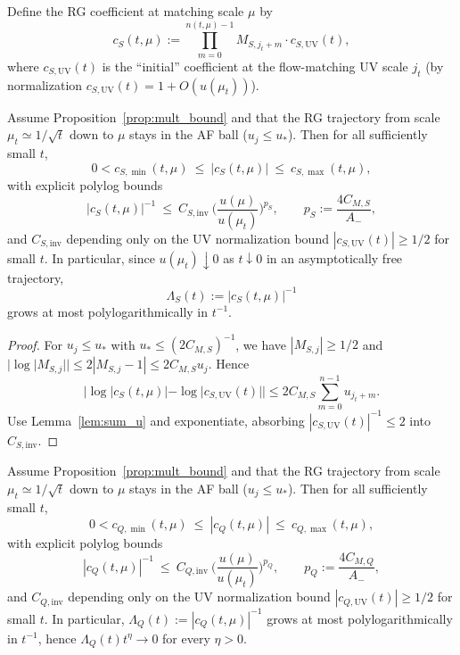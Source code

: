 Define the RG coefficient at matching scale $\mu$ by
\[
c_S(t,\mu):=\prod_{m=0}^{n(t,\mu)-1} M_{S,j_t+m}\cdot c_{S,\mathrm{UV}}(t),
\]
where $c_{S,\mathrm{UV}}(t)$ is the ``initial'' coefficient at the flow-matching UV scale $j_t$ (by normalization $c_{S,\mathrm{UV}}(t)=1+O(u(\mu_t))$).

\begin{theorem}\label{thm:cS}
Assume Proposition~\ref{prop:mult_bound} and that the RG trajectory from scale $\mu_t\simeq 1/\sqrt t$ down to $\mu$ stays in the AF ball ($u_j\le u_\ast$).
Then for all sufficiently small $t$,
\begin{equation}\label{eq:cS_bounds}
0< c_{S,\min}(t,\mu)\ \le\ |c_S(t,\mu)|\ \le\ c_{S,\max}(t,\mu),
\end{equation}
with explicit polylog bounds
\begin{equation}\label{eq:polylog}
|c_S(t,\mu)|^{-1}\ \le\ C_{S,\mathrm{inv}}\ \Big(\frac{u(\mu)}{u(\mu_t)}\Big)^{p_S},
\qquad
p_S:=\frac{4C_{M,S}}{A_-},
\end{equation}
and $C_{S,\mathrm{inv}}$ depending only on the UV normalization bound $|c_{S,\mathrm{UV}}(t)|\ge 1/2$ for small $t$.
In particular, since $u(\mu_t)\downarrow 0$ as $t\downarrow 0$ in an asymptotically free trajectory,
\[
\Lambda_S(t):=|c_S(t,\mu)|^{-1}
\]
grows at most polylogarithmically in $t^{-1}$.
\end{theorem}

\begin{proof}
For $u_j\le u_\ast$ with $u_\ast\le (2C_{M,S})^{-1}$, we have $|M_{S,j}|\ge 1/2$ and
$|\log|M_{S,j}||\le 2|M_{S,j}-1|\le 2C_{M,S}u_j$.
Hence
\[
|\log|c_S(t,\mu)|-\log|c_{S,\mathrm{UV}}(t)||\le 2C_{M,S}\sum_{m=0}^{n-1}u_{j_t+m}.
\]
Use Lemma~\ref{lem:sum_u} and exponentiate, absorbing $|c_{S,\mathrm{UV}}(t)|^{-1}\le 2$ into $C_{S,\mathrm{inv}}$.
\end{proof}

\begin{theorem}\label{thm:cQ}
Assume Proposition~\ref{prop:mult_bound} and that the RG trajectory from scale $\mu_t\simeq 1/\sqrt t$ down to $\mu$ stays in the AF ball ($u_j\le u_\ast$).
Then for all sufficiently small $t$,
\begin{equation}\label{eq:cQ_bounds}
0< c_{Q,\min}(t,\mu)\ \le\ |c_Q(t,\mu)|\ \le\ c_{Q,\max}(t,\mu),
\end{equation}
with explicit polylog bounds
\begin{equation}\label{eq:polylog_Q}
|c_Q(t,\mu)|^{-1}\ \le\ C_{Q,\mathrm{inv}}\ \Big(\frac{u(\mu)}{u(\mu_t)}\Big)^{p_Q},
\qquad
p_Q:=\frac{4C_{M,Q}}{A_-},
\end{equation}
and $C_{Q,\mathrm{inv}}$ depending only on the UV normalization bound $|c_{Q,\mathrm{UV}}(t)|\ge 1/2$ for small $t$.
In particular, $\Lambda_Q(t):=|c_Q(t,\mu)|^{-1}$ grows at most polylogarithmically in $t^{-1}$, hence $\Lambda_Q(t)t^\eta\to0$ for every $\eta>0$.
\end{theorem}

